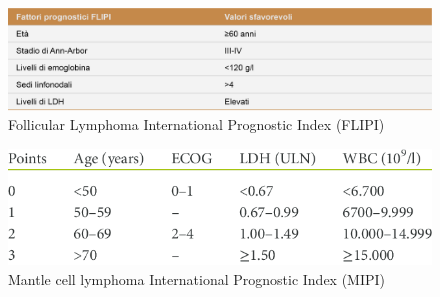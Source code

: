 \begin{figure}[H]
    \begin{center}
    \includegraphics[width=0.6\columnwidth]{img/FLIPI.png}
    \vspace{-3mm}
    \end{center}
    \caption{Follicular Lymphoma International Prognostic Index (FLIPI)
    \cite{img19}}
    \label{fig:FIGURE_2.17}
\end{figure}

\begin{figure}[H]
    \begin{center}
    \includegraphics[width=0.5\columnwidth]{img/MIPI.png}
    \vspace{-3mm}
    \end{center}
    \caption{Mantle cell lymphoma International Prognostic Index (MIPI)
    \cite{MIPI}}
\label{fig:FIGURE_2.18}
\end{figure}

